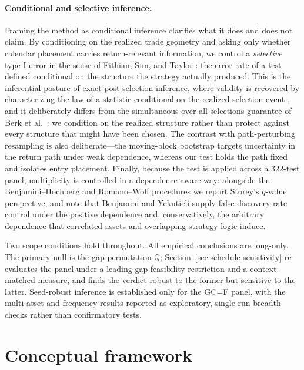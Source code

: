 \documentclass[preprint,12pt]{elsarticle}
\theoremstyle{definition}
\begin{document}
\paragraph{Conditional and selective inference.} Framing the method as conditional inference clarifies what it does and does not claim. By conditioning on the realized trade geometry and asking only whether calendar placement carries return-relevant information, we control a \emph{selective} type-I error in the sense of Fithian, Sun, and Taylor \cite{FithianSunTaylor2014}: the error rate of a test defined conditional on the structure the strategy actually produced. This is the inferential posture of exact post-selection inference, where validity is recovered by characterizing the law of a statistic conditional on the realized selection event \cite{LeeSunSunTaylor2016}, and it deliberately differs from the simultaneous-over-all-selections guarantee of Berk et al.\ \cite{BerkBrownBujaZhangZhao2013}: we condition on the realized structure rather than protect against every structure that might have been chosen. The contrast with path-perturbing resampling is also deliberate---the moving-block bootstrap \cite{Kunsch1989} targets uncertainty in the return path under weak dependence, whereas our test holds the path fixed and isolates entry placement. Finally, because the test is applied across a $322$-test panel, multiplicity is controlled in a dependence-aware way: alongside the Benjamini--Hochberg \cite{benjaminihochberg1995} and Romano--Wolf \cite{romanowolf2005} procedures we report Storey's \cite{Storey2002} $q$-value perspective, and note that Benjamini and Yekutieli \cite{BenjaminiYekutieli2001} supply false-discovery-rate control under the positive dependence and, conservatively, the arbitrary dependence that correlated assets and overlapping strategy logic induce.

Two scope conditions hold throughout. All empirical conclusions are long-only. The primary null is the gap-permutation $\mathbb{Q}$; Section~\ref{sec:schedule-sensitivity} re-evaluates the panel under a leading-gap feasibility restriction and a context-matched measure, and finds the verdict robust to the former but sensitive to the latter. Seed-robust inference is established only for the GC=F panel, with the multi-asset and frequency results reported as exploratory, single-run breadth checks rather than confirmatory tests.

\section{Conceptual framework}
\end{document}
